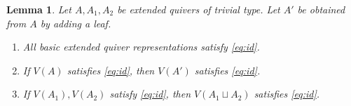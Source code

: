 \documentclass[12pt]{article}
\newtheorem{lemma}[theorem]{Lemma}
\theoremstyle{definition}
\theoremstyle{remark}
\begin{document}
\begin{lemma}\label{lem:trivtype}
    Let $A,A_1,A_2$ be extended quivers of trivial type. Let $A'$ be obtained from $A$ by adding a leaf.
    
    \begin{enumerate}
        \item All basic extended quiver representations satisfy \eqref{eq:id}.\label{lem:trivtype1}
        \item If $V(A)$ satisfies \eqref{eq:id}, then $V(A')$ satisfies \eqref{eq:id}.\label{lem:trivtype2}
        \item If $V(A_1),V(A_2)$ satisfy \eqref{eq:id}, then $V(A_1\sqcup A_2)$ satisfies \eqref{eq:id}.\label{lem:trivtype3}
    \end{enumerate}
\end{lemma}
\end{document}
